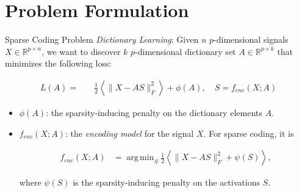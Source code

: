 \documentclass{beamer}
\DeclareMathOperator*{\argmin}{arg\,min}
\newcommand{\R}{\mathbb{R}}
\begin{document}
\section{Problem Formulation}

\begin{frame}{Sparse Coding Problem}
\emph{Dictionary Learning}: Given $n$ $p$-dimensional signals $X \in \R^{p \times n}$, we want to discover $k$ $p$-dimensional dictionary set $A \in \R^{p \times k}$ that minimizes the following loss:

\begin{beamerboxesrounded}[lower=lowyellow,upper=upyellow,shadow=true]{}
\begin{align*}
L(A) = \quad &  \frac{1}{2} \left\langle\| X - A S \|_F^2\right \rangle + \phi (A), \quad S = f_{enc}(X; A)
\end{align*}
\end{beamerboxesrounded}

\begin{itemize}
	\item<1> $\phi(A)$: the sparsity-inducing penalty on the dictionary elements $A$.
	\item<2> $f_{enc}(X; A)$: the \emph{encoding model} for the signal $X$.  For sparse coding, it is

\begin{align*}
	f_{enc}(X; A) &= \argmin_S \frac{1}{2} \left\langle\| X - A S \|_F^2 + \psi (S)\right \rangle,
\end{align*}

where $\psi(S)$ is the sparsity-inducing penalty on the activations $S$.
\end{itemize}

\end{frame}
\end{document}
